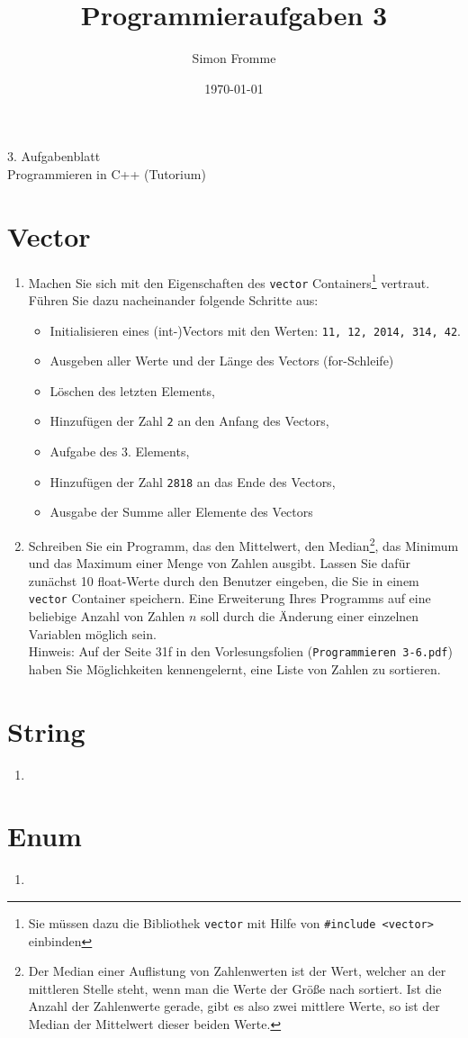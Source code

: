 \documentclass[paper=a4, fontsize=11pt, twoside]{scrartcl}
\title{Programmieraufgaben 3}
\author{Simon Fromme}
\date{\normalsize\today}
\begin{document}
\vspace*{0.75\baselineskip}
\begin{center}
  \Large 3. Aufgabenblatt \\\vspace{0.5em} \large Programmieren in C++ (Tutorium)
\end{center}

\section*{Vector}
\begin{enumerate}
\item Machen Sie sich mit den Eigenschaften des \texttt{vector} Containers\footnote{Sie müssen dazu die Bibliothek \texttt{vector} mit Hilfe von \texttt{#include <vector>} einbinden } vertraut. Führen Sie dazu nacheinander folgende Schritte aus:
  \begin{itemize}
  \item Initialisieren eines (int-)Vectors mit den Werten: \texttt{11, 12, 2014, 314, 42}.
  \item Ausgeben aller Werte und der Länge des Vectors (for-Schleife)
  \item Löschen des letzten Elements,
  \item Hinzufügen der Zahl \texttt{2} an den Anfang des Vectors,
  \item Aufgabe des 3. Elements,
  \item Hinzufügen der Zahl \texttt{2818} an das Ende des Vectors,
  \item Ausgabe der Summe aller Elemente des Vectors
  \end{itemize}

   \item Schreiben Sie ein Programm, das den Mittelwert, den Median\footnote{Der Median einer Auflistung von Zahlenwerten ist der Wert, welcher an der mittleren Stelle steht, wenn man die Werte der Größe nach sortiert. Ist die Anzahl der Zahlenwerte gerade, gibt es also zwei mittlere Werte, so ist der Median der Mittelwert dieser beiden Werte.}, das Minimum und das Maximum einer Menge von Zahlen ausgibt. Lassen Sie dafür zunächst 10 float-Werte durch den Benutzer eingeben, die Sie in einem \texttt{vector} Container speichern. Eine Erweiterung Ihres Programms auf eine beliebige Anzahl von Zahlen $n$ soll durch die Änderung einer einzelnen Variablen möglich sein. \\
Hinweis: Auf der Seite 31f in den Vorlesungsfolien (\texttt{Programmieren 3-6.pdf}) haben Sie Möglichkeiten kennengelernt, eine Liste von Zahlen zu sortieren.
\end{enumerate}

\section*{String}
\begin{enumerate}[resume]
   \item
\end{enumerate}

\section*{Enum}
\begin{enumerate}[resume]
   \item
\end{enumerate}
\end{document}

